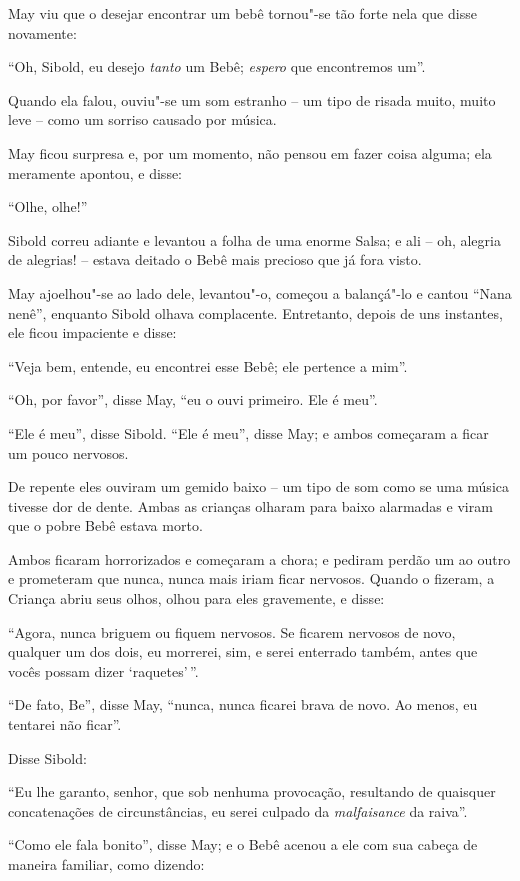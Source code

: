 May viu que o desejar encontrar um bebê tornou"-se tão forte nela que
disse novamente:

``Oh, Sibold, eu desejo \emph{tanto} um Bebê; \emph{espero} que
encontremos um''.

Quando ela falou, ouviu"-se um som estranho -- um tipo de risada muito,
muito leve -- como um sorriso causado por música.

May ficou surpresa e, por um momento, não pensou em fazer coisa alguma;
ela meramente apontou, e disse:

``Olhe, olhe!''

Sibold correu adiante e levantou a folha de uma enorme Salsa; e ali --
oh, alegria de alegrias! -- estava deitado o Bebê mais precioso que já
fora visto.

May ajoelhou"-se ao lado dele, levantou"-o, começou a balançá"-lo e cantou
``Nana nenê'', enquanto Sibold olhava complacente. Entretanto, depois de
uns instantes, ele ficou impaciente e disse:

``Veja bem, entende, eu encontrei esse Bebê; ele pertence a mim''.

``Oh, por favor'', disse May, ``eu o ouvi primeiro. Ele é meu''.

``Ele é meu'', disse Sibold. ``Ele é meu'', disse May; e ambos começaram
a ficar um pouco nervosos.

De repente eles ouviram um gemido baixo -- um tipo de som como se uma
música tivesse dor de dente. Ambas as crianças olharam para baixo
alarmadas e viram que o pobre Bebê estava morto.

Ambos ficaram horrorizados e começaram a chora; e pediram perdão um ao
outro e prometeram que nunca, nunca mais iriam ficar nervosos. Quando o
fizeram, a Criança abriu seus olhos, olhou para eles gravemente, e
disse:

``Agora, nunca briguem ou fiquem nervosos. Se ficarem nervosos de novo,
qualquer um dos dois, eu morrerei, sim, e serei enterrado também, antes
que vocês possam dizer `raquetes'\,''.

``De fato, Be'', disse May, ``nunca, nunca ficarei brava de novo. Ao
menos, eu tentarei não ficar''.

Disse Sibold:

``Eu lhe garanto, senhor, que sob nenhuma provocação, resultando de
quaisquer concatenações de circunstâncias, eu serei culpado da
\emph{malfaisance} da raiva''.

``Como ele fala bonito'', disse May; e o Bebê acenou a ele com sua
cabeça de maneira familiar, como dizendo:

